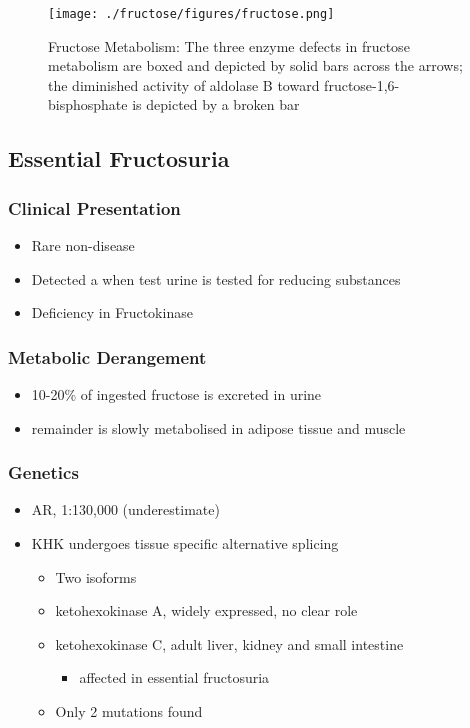 \documentclass{scrartcl}
\begin{document}
\begin{figure}[htbp]
\centering
\texttt{[image: ./fructose/figures/fructose.png]}
\caption[Fructose]{\label{fig:orgf85ac2a}
Fructose Metabolism: The three enzyme defects in fructose metabolism are boxed and depicted by solid bars across the arrows; the diminished activity of aldolase B toward fructose-1,6-bisphosphate is depicted by a broken bar}
\end{figure}

\subsection{Essential Fructosuria}
\label{sec:orgc90b6b5}
\subsubsection{Clinical Presentation}
\label{sec:org8590438}
\begin{itemize}
\item Rare non-disease
\item Detected a when test urine is tested for reducing substances
\item Deficiency in Fructokinase
\end{itemize}
\subsubsection{Metabolic Derangement}
\label{sec:org89134b3}
\begin{itemize}
\item 10-20\% of ingested fructose is excreted in urine
\item remainder is slowly metabolised in adipose tissue and muscle
\end{itemize}
\subsubsection{Genetics}
\label{sec:org71c6dcb}
\begin{itemize}
\item AR, 1:130,000 (underestimate)
\item KHK undergoes tissue specific alternative splicing
\begin{itemize}
\item Two isoforms
\item ketohexokinase A, widely expressed, no clear role
\item ketohexokinase C, adult liver, kidney and small intestine
\begin{itemize}
\item affected in essential fructosuria
\end{itemize}
\item Only 2 mutations found
\end{itemize}
\end{itemize}
\end{document}
